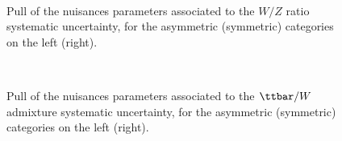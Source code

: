 \begin{figure}[tbhp]
    \caption{ Pull of the nuisances parameters associated to the $W/Z$ ratio systematic uncertainty, 
      for the asymmetric (symmetric) categories on the left (right).
      \label{fig:nuisPull_W_Z_ratio}}
  \begin{center}
     ~~
  \end{center}
\end{figure}


\begin{figure}[tbhp]
    \caption{ Pull of the nuisances parameters associated to the $\ttbar/W$ admixture systematic uncertainty, 
      for the asymmetric (symmetric) categories on the left (right).
      \label{fig:nuisPull_tt_W_admixture}}
  \begin{center}
     ~~
  \end{center}
\end{figure}



